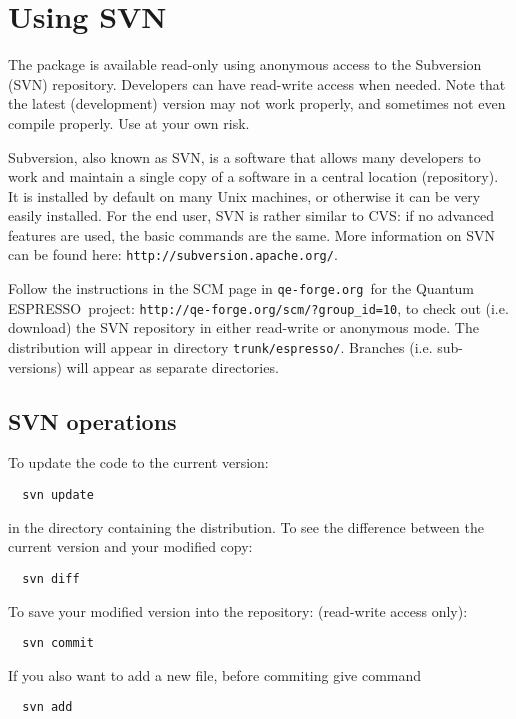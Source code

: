 \documentclass[12pt,a4paper]{article}
\def\qe{{\sc Quantum ESPRESSO}}
\def\qeforge{\texttt{qe-forge.org}}
\begin{document}
\section{ Using SVN}
\label{Sec:SVN}
The package is available read-only using anonymous access to the Subversion 
(SVN) repository. Developers can have read-write access when needed. Note 
that the latest (development) version may not work properly, and sometimes 
not even compile properly. Use at your own risk. 

Subversion, also known as SVN, is a software that allows many
developers to work and maintain a single copy of a software in a
central location (repository).
It is installed by default on many Unix machines, or otherwise 
it can be very easily installed.
For the end user, SVN is rather similar to CVS:
if no advanced features are used, the basic commands are the same.
More information on SVN can be found here: 
\texttt{http://subversion.apache.org/}.

Follow the instructions in the SCM page in \qeforge\ for the \qe\
project: \texttt{http://qe-forge.org/scm/?group\_id=10},
to check out (i.e.  download) the SVN repository in either 
read-write or anonymous mode.
The distribution will appear in directory \texttt{trunk/espresso/}.
Branches (i.e. sub-versions) will appear as separate directories.

\subsection{SVN operations}

To update the code to the current version: 
\begin{verbatim}
  svn update
\end{verbatim}
in the directory containing the distribution.
To see the difference between the current version and your modified 
copy:
\begin{verbatim}
  svn diff
\end{verbatim}
To save your modified version into the repository:
(read-write access only):
\begin{verbatim}
  svn commit
\end{verbatim}
If you also want to add a new file, before commiting give command
\begin{verbatim}
  svn add
\end{verbatim}
\end{document}
